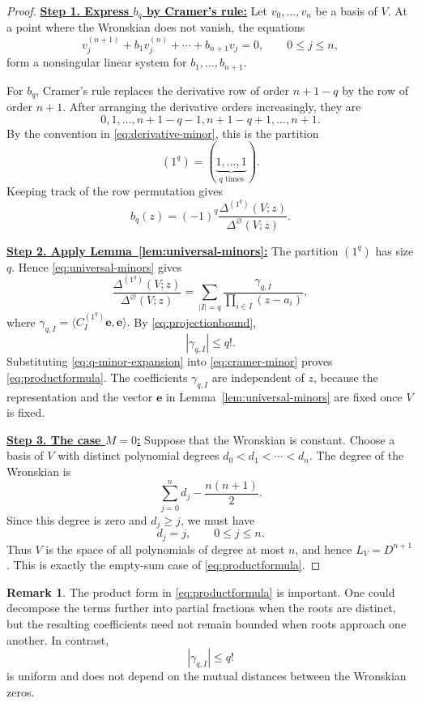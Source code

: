 \documentclass[12pt,letterpaper,reqno]{amsart}
\theoremstyle{definition}
\newtheorem{rem}[thm]{Remark}
\numberwithin{equation}{section}
\newcommand{\ev}{\bm  e}
\begin{document}
\begin{proof}

\medskip\noindent
\textbf{\underline{Step 1. Express \(b_q\) by Cramer's rule:}}
Let \(v_0,\ldots,v_{n}\) be a basis of \(V\). At a point where the
Wronskian does not vanish, the equations
\[
v_j^{(n+1)}
+
b_1v_j^{(n)}
+\cdots+
b_{n+1}v_j
=0,
\qquad
0\leq j\leq n,
\]
form a nonsingular linear system for
\(b_1,\ldots,b_{n+1}\).

For \(b_q\), Cramer's rule replaces the derivative row of order
\({n+1}-q\) by the row of order \({n+1}\). After arranging the derivative
orders increasingly, they are
\[
0,1,\ldots,{n+1}-q-1,
{n+1}-q+1,\ldots,{n+1}.
\]
By the convention in \eqref{eq:derivative-minor}, this is the
partition
\[
(1^q)
=
(\underbrace{1,\ldots,1}_{q\text{ times}}).
\]
Keeping track of the row permutation gives
\begin{equation}\label{eq:cramer-minor}
 b_q(z)
 =
 (-1)^q
 \frac{\Delta^{(1^q)}(V;z)}
      {\Delta^\varnothing(V;z)}.
\end{equation}

\medskip\noindent
\textbf{\underline{Step 2. Apply Lemma~\ref{lem:universal-minors}:}}
The partition \((1^q)\) has size \(q\). Hence
\eqref{eq:universal-minors} gives
\begin{equation}\label{eq:q-minor-expansion}
\frac{\Delta^{(1^q)}(V;z)}
     {\Delta^\varnothing(V;z)}
=
\sum_{|I|=q}
\frac{\gamma_{q,I}}
     {\prod_{i\in I}(z-a_i)},
\end{equation}
where
$
\gamma_{q,I}
=
\langle C_I^{(1^q)}\ev,\ev\rangle.
$
By \eqref{eq:projectionbound},
\[
|\gamma_{q,I}|\leq q!.
\]
Substituting \eqref{eq:q-minor-expansion} into
\eqref{eq:cramer-minor} proves \eqref{eq:productformula}. The coefficients \(\gamma_{q,I}\) are
independent of \(z\), because the representation and the vector
\(\ev\) in Lemma~\ref{lem:universal-minors} are fixed once \(V\) is
fixed.

\medskip\noindent
\textbf{\underline{Step 3. The case \(M=0\):}}
Suppose that the Wronskian is constant. Choose a basis of \(V\) with
distinct polynomial degrees
$
d_0<d_1<\cdots<d_{n}.
$
The degree of the Wronskian is
\[
\sum_{j=0}^{n}d_j-\frac{n(n+1)}2.
\]
Since this degree is zero and \(d_j\geq j\), we must have
\[
d_j=j,
\qquad
0\leq j\leq n.
\]
Thus \(V\) is the space of all polynomials of degree at most \(n\),
and hence \(L_V=D^{n+1}\).
This is exactly the empty-sum case of \eqref{eq:productformula}.
\end{proof}

\begin{rem}\label{rem:product-form}
The product form in \eqref{eq:productformula} is important. One could
decompose the terms further into partial fractions when the roots are
distinct, but the resulting coefficients need not remain bounded when
roots approach one another. In contrast,
\[
|\gamma_{q,I}|\leq q!
\]
is uniform and does not depend on the mutual distances between the
Wronskian zeros.
\end{rem}
\end{document}
